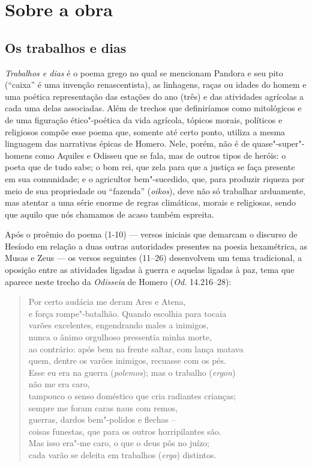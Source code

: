 \section{Sobre a obra}

\subsection{Os trabalhos e dias}

\emph{Trabalhos e dias} é o poema grego no qual se mencionam Pandora e
seu pito (``caixa'' é uma invenção renascentista), as linhagens, raças
ou idades do homem e uma poética representação das estações do ano
(três) e das atividades agrícolas a cada uma delas associadas. Além de
trechos que definiríamos como mitológicos e de uma figuração
ético"-poética da vida agrícola, tópicos morais, políticos e religiosos
compõe esse poema que, somente até certo ponto, utiliza a mesma linguagem das
narrativas épicas de Homero. Nele, porém, não é de quase"-super"-homens
como Aquiles e Odisseu que se fala, mas de outros tipos de heróis: o
poeta que de tudo sabe; o bom rei, que zela para que a justiça se faça
presente em sua comunidade; e o agricultor bem"-sucedido, que, para
produzir riqueza por meio de sua propriedade ou ``fazenda''
(\emph{oikos}), deve não só trabalhar arduamente, mas atentar a uma
série enorme de regras climáticas, morais e religiosas, sendo que aquilo
que nós chamamos de acaso também espreita.

Após o proêmio do poema (1-10) --- versos iniciais que demarcam o discurso de Hesíodo em relação a duas outras autoridades presentes na poesia hexamétrica, as Musas e Zeus --- os versos seguintes (11--26) desenvolvem um tema
tradicional, a oposição entre as atividades ligadas à guerra e aquelas
ligadas à paz, tema que aparece neste trecho da \emph{Odisseia} de
Homero (\emph{Od.} 14.216--28):

\begin{verse}
Por certo audácia me deram Ares e Atena,\\
e força rompe"-batalhão. Quando escolhia para tocaia\\
varões excelentes, engendrando males a inimigos,\\
nunca o ânimo orgulhoso pressentia minha morte,\\
ao contrário: após bem na frente saltar, com lança matava\\
quem, dentre os varões inimigos, recuasse com os pés.\\
Esse eu era na guerra (\emph{polemos}); mas o trabalho (\emph{ergon})\\
não me era caro,\\
tampouco o senso doméstico que cria radiantes crianças;\\
sempre me foram caras naus com remos,\\
guerras, dardos bem"-polidos e flechas --\\
coisas funestas, que para os outros horripilantes são.\\
Mas isso era"-me caro, o que o deus pôs no juízo;\\
cada varão se deleita em trabalhos (\emph{erga}) distintos.
\end{verse}

